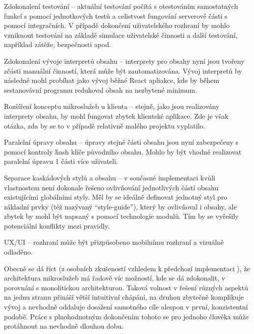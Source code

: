 \begin{dl}
   \item[Zdokonalení testování] – aktuální testování počítá s otestováním samostatných funkcí s pomocí jednotkových testů a celistvost fungování serverové části s pomocí integračních.
   V případě dokončení uživatelského rozhraní by mohlo vzniknout testování na základě simulace uživatelské činnosti a další testování, například zátěže, bezpečnosti apod.
   \item[Zdokonalení vývoje interpretů obsahu] – interprety pro obsahy nyní jsou tvořeny zčásti manuální činností, která může být zautomatizována.
   Vývoj interpretů by následně mohl probíhat jako vývoj běžné React apliakce, kde by během sestanovávní programu redukoval obsah na nezbytené minimum.
   \item[Rozšíření konceptu mikroslužeb u klienta] – stejně, jako jsou realizovány interprety obsahu, by mohl fungovat zbytek klientské aplikace.
   Zde je však otázka, zda by se to v případě relativně malého projektu vyplatilo.
   \item[Paralelní úpravy obsahu] – úpravy stejné části obsahu jsou nyní zabezpečeny s pomocí kontroly \h{hash} klíče původního obsahu.
   Mohlo by být vhodné realizovat paralelní úpravu 1 části více uživateli.
   \item[Separace kaskádových stylů a obsahu] – v současné implementaci kvůli vlastnostem  není dokonale řešeno ovlivňování jednotlivých částí obsahu existujícími globálními styly.
   Měl by se ideálně definovat jednotný styl pro základní prvky (též nazývaný \enquote{style-guide}), který by ovlivňoval i obsahy, ale zbytek by mohl být napsaný s pomocí technologie  modulů.
   Tím by se vyřešily potenciální konflikty mezi  pravidly.
   \item[UX/UI] – rozhraní může být přizpůsobeno mobilnímu rozhraní a vizuálně odladěno.
\end{dl}

Obecně se dá říct (z osobních zkušeností vzhledem k předchozí implementaci ), že architektura mikroslužeb má řadově víc možností, kde se dá zdokonalit, v porovnání s monolitickou architekturou.
Taková volnost v řešení různých aspektů na jednu stranu přináší větší intuitivní chápání, na druhou zbytečně komplikuje vývoj a nevhodně oddaluje dosažení samotného cíle alespon v první, konzistentní podobě.
Práce s plnohodnotným dokončením tohoto  se pro jednoho člověka může protáhnout na nevhodně dlouhou dobu.
